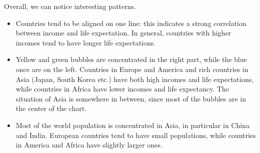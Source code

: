 Overall, we can notice interesting patterns.
\begin{itemize}
	\item Countries tend to be aligned on one line: this indicates a strong correlation between income and life expectation. In general, countries with higher incomes tend to have longer life expectations.
	\item Yellow and green bubbles are concentrated in the right part, while the blue once are on the left. Countries in Europe and America and rich countries in Asia (Japan, South Korea etc.) have both high incomes and life expectations, while countries in Africa have lower incomes and life expectancy. The situation of Asia is somewhere in between, since most of the bubbles are in the center of the chart.
	\item Most of the world population is concentrated in Asia, in particular in China and India. European countries tend to have small populations, while countries in America and Africa have slightly larger ones.
\end{itemize}
